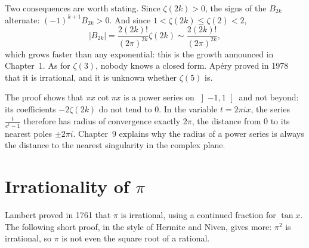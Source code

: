 Two consequences are worth stating. Since $\zeta(2k)>0$, the signs of the $B_{2k}$ alternate: $(-1)^{k+1}B_{2k}>0$. And since
$1<\zeta(2k)\le\zeta(2)<2$,
\[
|B_{2k}|=\frac{2(2k)!}{(2\pi)^{2k}}\zeta(2k)\sim\frac{2(2k)!}{(2\pi)^{2k}},
\]
which grows faster than any exponential: this is the growth announced in Chapter~1. As for $\zeta(3)$, nobody knows a closed
form. Ap\'ery proved in 1978 that it is irrational, and it is unknown whether $\zeta(5)$ is.

\begin{remark}
The proof shows that $\pi x\cot\pi x$ is a power series on $\left]-1,1\right[$ and not beyond: its coefficients $-2\zeta(2k)$ do not
tend to $0$. In the variable $t=2\pi ix$, the series $\frac t{e^t-1}$ therefore has radius of convergence exactly $2\pi$, the
distance from $0$ to its nearest poles $\pm2\pi i$. Chapter~9 explains why the radius of a power series is always the distance
to the nearest singularity in the complex plane.
\end{remark}

\section{Irrationality of \texorpdfstring{$\pi$}{pi}}

Lambert proved in 1761 that $\pi$ is irrational, using a continued fraction for $\tan x$. The following short proof, in the
style of Hermite and Niven, gives more: $\pi^2$ is irrational, so $\pi$ is not even the square root of a rational.

